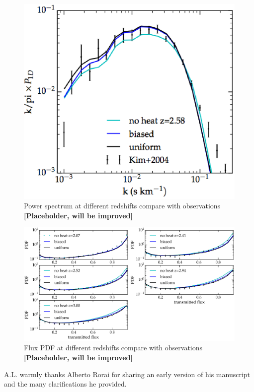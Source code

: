 \documentclass[numberedappendix]{emulateapj}
\newcommand\ALc[1]{{\color{red} \bf #1}} %
\begin{document}
\begin{figure}[h]
\centering
\includegraphics[width = .45\textwidth ]{powerspec}
\caption{ Power spectrum at different redshifts compare with observations \ALc{[Placeholder, will be improved]}}
\label{fig:powespec}
\end{figure}

\begin{figure}[h]
\centering
\includegraphics[width = .9\textwidth ]{flux_PDF}
\caption{Flux PDF at different redshifts compare with observations \ALc{[Placeholder, will be improved]}}
\label{fig:fluxPDF}
\end{figure}

\begin{acknowledgements}
A.L. warmly thanks Alberto Rorai for sharing an early version of his manuscript and the many clarifications he provided.
\end{acknowledgements}




\end{document}
